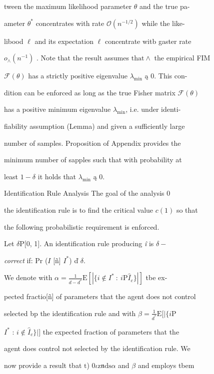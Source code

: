\documentclass[a4paper,12pt]{article}
\begin{document}
tween the maximum likelihood parameter $\theta$ and the true pa-

ameter $\theta^{*}$ concentrates with rate $\mathcal{O}(n^{-1/2})$ while the like-

libood $\hat{\ell}$ and its expectation $\ell$ concentrate witb gaster rate

$o_{\wedge}(n^{-1})$ . Note that the result assumes $\mathrm{t}\mathrm{h}\mathrm{a}\mathrm{t}\wedge$ the empirical FIM

$\mathcal{F}(\theta)$ has a strictly positive eigenvalue $\lambda_{\min}$ ą $0$. This con-

dition can be enforced as long as the true Fisher matrix $\mathcal{F}(\theta)$

has a positive minimum eigenvalue $\lambda_{\min}$, i.e. under identi-

fiability assumption (Lemma) and given a sufficiently large

number of samples. Proposition of Appendix provides the

minimum number of sapples such that with probability at

least $ 1-\delta$ it holds that $\lambda_{\min}$ ą $0.$

Identification Rule Analysis The goal of the analysis $0$

the identification rule is to find the critical value $c(1)$ so that

the following probabilistic requirement is enforced.

Let $\delta \mathrm{P} [0$, 1$]$. An identification rule producing {\it î} is $\delta-$

{\it correct} if: $\mathrm{P}\mathrm{r}$ ($I$ [ñ] $I^{*}$) ď $\delta.$

We denote with $\alpha = \displaystyle \frac{1}{d-d^{*}}\mathrm{E}[|\{i\not\in I^{*}\ :\ i\mathrm{P}\hat{I}_{c}\}|]$ tbe ex-

pected fractio[ñ] of parameters that the agent does not control

selected bp the identification rule and with $\beta = \displaystyle \frac{1}{d^{*}}\mathrm{E}[|\{i \mathrm{P}$

$I^{*}$ : $i \not\in \hat{I}_{c}\}|]$ the expected fraction of parameters that the

agent does control not selected by the identification rule. We

now provide a result tbat $\mathrm{t}$) $ 0\iota \mathrm{z}\mathfrak{n}\mathrm{d}\mathrm{s}\alpha$ and $\beta$ and employs tbem
\end{document}
